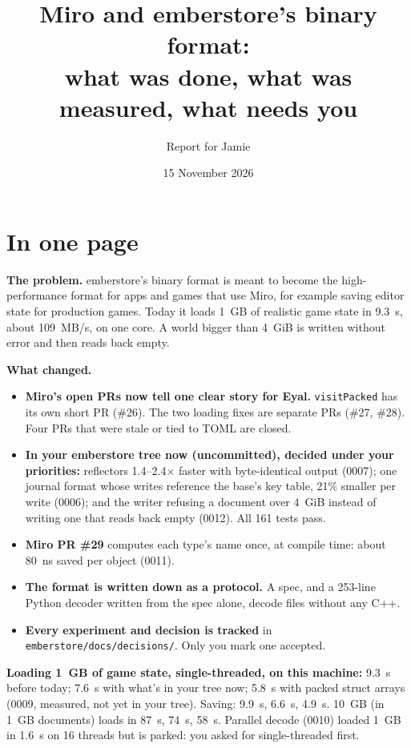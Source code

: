 \documentclass[11pt,a4paper]{article}
\title{Miro and emberstore's binary format:\\ what was done, what was measured, what needs you}
\author{Report for Jamie}
\date{15 November 2026}
\newcommand{\code}[1]{\texttt{#1}}
\begin{document}
\maketitle

\section*{In one page}

\textbf{The problem.} emberstore's binary format is meant to become the high-performance format for apps and games that use Miro, for example saving editor state for production games. Today it loads 1~GB of realistic game state in 9.3~s, about 109~MB/s, on one core. A world bigger than 4~GiB is written without error and then reads back empty.

\textbf{What changed.}
\begin{itemize}
  \item \textbf{Miro's open PRs now tell one clear story for Eyal.} \code{visitPacked} has its own short PR (\#26). The two loading fixes are separate PRs (\#27, \#28). Four PRs that were stale or tied to TOML are closed.
  \item \textbf{In your emberstore tree now (uncommitted), decided under your priorities:} reflectors 1.4--2.4$\times$ faster with byte-identical output (0007); one journal format whose writes reference the base's key table, 21\% smaller per write (0006); and the writer refusing a document over 4~GiB instead of writing one that reads back empty (0012). All 161 tests pass.
  \item \textbf{Miro PR \#29} computes each type's name once, at compile time: about 80~ns saved per object (0011).
  \item \textbf{The format is written down as a protocol.} A spec, and a 253-line Python decoder written from the spec alone, decode files without any C++.
  \item \textbf{Every experiment and decision is tracked} in \code{emberstore/docs/decisions/}. Only you mark one accepted.
\end{itemize}

\textbf{Loading 1~GB of game state, single-threaded, on this machine:} 9.3~s before today; 7.6~s with what's in your tree now; 5.8~s with packed struct arrays (0009, measured, not yet in your tree). Saving: 9.9~s, 6.6~s, 4.9~s. 10~GB (in 1~GB documents) loads in 87~s, 74~s, 58~s. Parallel decode (0010) loaded 1~GB in 1.6~s on 16 threads but is parked: you asked for single-threaded first.
\end{document}
